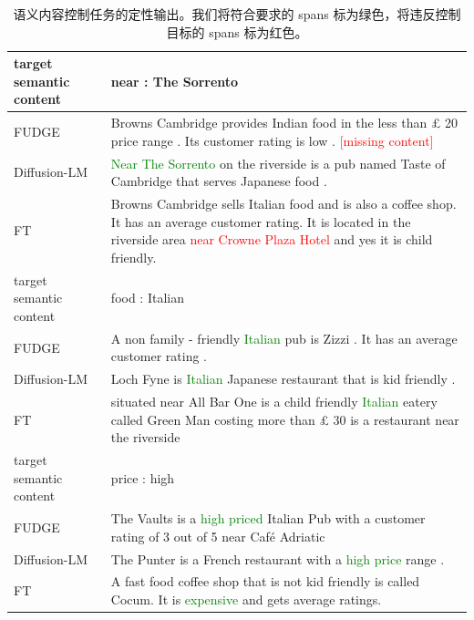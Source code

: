 \documentclass{article}
\newcommand\errorspan[1]{\textcolor{red}{#1}}
\newcommand\greenspan[1]{\textcolor{green}{#1}}
\begin{document}
\begin{table}
{\begin{tabular}{lp{13cm}}
\\
\toprule
target semantic content &  near : The Sorrento \\
\midrule
FUDGE &  Browns Cambridge provides Indian food in the less than £ 20 price range . Its customer rating is low . \errorspan{[missing content]}\\
Diffusion-LM &   \greenspan{Near The Sorrento} on the riverside is a pub named Taste of Cambridge that serves Japanese food . \\
FT &  Browns Cambridge sells Italian food and is also a coffee shop. It has an average customer rating. It is located in the riverside area \errorspan{near Crowne Plaza Hotel} and yes it is child friendly. 
\\
\toprule
target semantic content &  food : Italian \\
\midrule
FUDGE &  A non family - friendly \greenspan{Italian} pub is Zizzi . It has an average customer rating .\\
Diffusion-LM &  Loch Fyne is \greenspan{Italian} Japanese restaurant that is kid friendly . \\
FT &   situated near All Bar One is a child friendly \greenspan{Italian} eatery called Green Man costing more than £ 30 is a restaurant near the riverside 
\\
\toprule
target semantic content &  price : high \\
\midrule
FUDGE &  The Vaults is a \greenspan{high priced} Italian Pub with a customer rating of 3 out of 5 near Café Adriatic \\
Diffusion-LM &   The Punter is a French restaurant with a \greenspan{high price} range . \\
FT &  A fast food coffee shop that is not kid friendly is called Cocum. It is \greenspan{expensive} and gets average ratings. 
\\
\end{tabular}}
\caption{\label{app:qualitative-content} 语义内容控制任务的定性输出。我们将符合要求的 spans 标为绿色，将违反控制目标的 spans 标为红色。}
\end{table}
\end{document}
